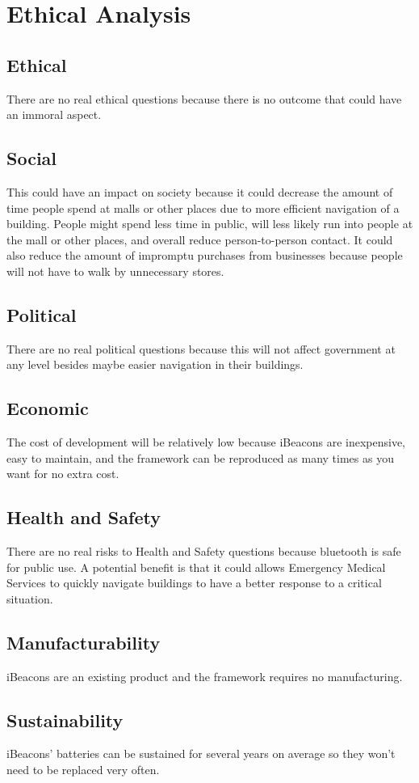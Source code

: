 \chapter{Ethical Analysis}
\section{Ethical}
There are no real ethical questions because there is no outcome that could have an immoral aspect.
\section{Social}
This could have an impact on society because it could decrease the amount of time people spend at malls or other places due to more efficient navigation of a building. People might spend less time in public, will less likely run into people at the mall or other places, and overall reduce person-to-person contact. It could also reduce the amount of impromptu purchases from businesses because people will not have to walk by unnecessary stores.
\section{Political}
There are no real political questions because this will not affect government at any level besides maybe easier navigation in their buildings.
\section{Economic}
The cost of development will be relatively low because iBeacons are inexpensive, easy to maintain, and the framework can be reproduced as many times as you want for no extra cost.
\section{Health and Safety}
There are no real risks to Health and Safety questions because bluetooth is safe for public use.
\newline
A potential benefit is that it could allows Emergency Medical Services to quickly navigate buildings to have a better response to a critical situation.
\section{Manufacturability}
iBeacons are an existing product and the framework requires no manufacturing.
\section{Sustainability}
iBeacons' batteries can be sustained for several years on average so they won't need to be replaced very often.
